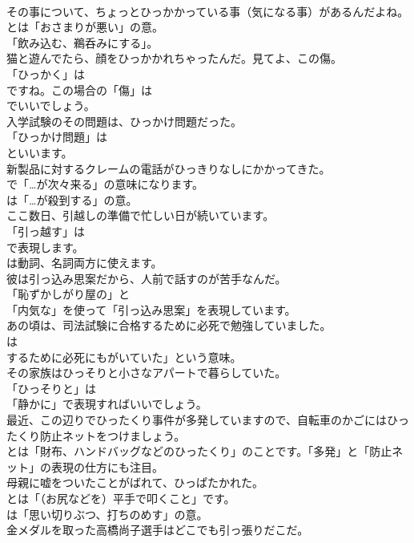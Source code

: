 \documentclass[8pt]{extreport}
\begin{document}
\begin{CJK}{UTF8}{min}
\\	その事について、ちょっとひっかかっている事（気になる事）があるんだよね。 
\\	とは「おさまりが悪い」の意。
\\	「飲み込む、鵜呑みにする」。	
\\	猫と遊んでたら、顔をひっかかれちゃったんだ。見てよ、この傷。 
\\	「ひっかく」は
\\	ですね。この場合の「傷」は
\\	でいいでしょう。	
\\	入学試験のその問題は、ひっかけ問題だった。 
\\	「ひっかけ問題」は
\\	といいます。	
\\	新製品に対するクレームの電話がひっきりなしにかかってきた。 
\\	で「…が次々来る」の意味になります。
\\	は「…が殺到する」の意。	
\\	ここ数日、引越しの準備で忙しい日が続いています。 
\\	「引っ越す」は
\\	で表現します。
\\	は動詞、名詞両方に使えます。	
\\	彼は引っ込み思案だから、人前で話すのが苦手なんだ。 
\\	「恥ずかしがり屋の」と
\\	「内気な」を使って「引っ込み思案」を表現しています。	
\\	あの頃は、司法試験に合格するために必死で勉強していました。 
\\	は
\\	するために必死にもがいていた」という意味。	
\\	その家族はひっそりと小さなアパートで暮らしていた。 
\\	「ひっそりと」は
\\	「静かに」で表現すればいいでしょう。	
\\	最近、この辺りでひったくり事件が多発していますので、自転車のかごにはひったくり防止ネットをつけましょう。 
\\	とは「財布、ハンドバッグなどのひったくり」のことです。「多発」と「防止ネット」の表現の仕方にも注目。	
\\	母親に嘘をついたことがばれて、ひっぱたかれた。 
\\	とは「（お尻などを）平手で叩くこと」です。
\\	は「思い切りぶつ、打ちのめす」の意。	
\\	金メダルを取った高橋尚子選手はどこでも引っ張りだこだ。 

\end{CJK}
\end{document}
